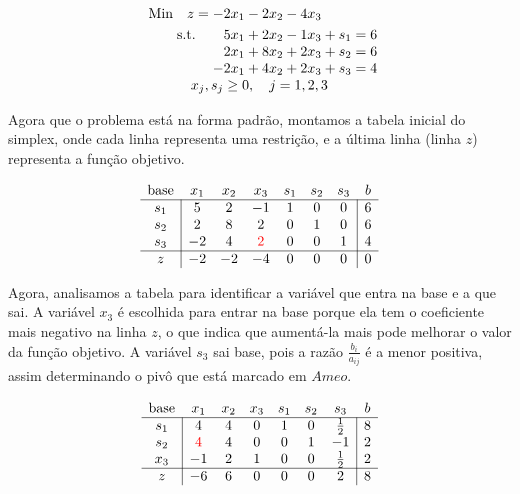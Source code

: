 \documentclass{article}
\begin{document}
\[
  \begin{array}{r@{}r@{}r@{}r@{}r@{}r@{}r}
    \text{Min} \quad z =  -2x_1 &{} - 2x_2 &{} - 4x_3 &{} \\[\jot]
    \text{s.t.}\quad\quad  5x_1 &{} + 2x_2 &{} - 1x_3 &{} + s_1 &{} = 6\\
                           2x_1 &{} + 8x_2 &{} + 2x_3 &{} + s_2 &{} = 6\\
                          -2x_1 &{} + 4x_2 &{} + 2x_3 &{} + s_3 &{} = 4\\

    \multicolumn{5}{c}{x_j, s_j \geq 0, \quad j=1, 2, 3}
  \end{array}
\]

Agora que o problema está na forma padrão, montamos a tabela inicial do simplex, onde cada linha representa uma restrição, e a última linha (linha \(z\)) representa a função objetivo.

\[
  \begin{array}{c|cccccc|c}
    \text{base} & x_1 & x_2 & x_3 & s_1 & s_2 & s_3 & b  \\ \hline
            s_1 &   5 &   2 &  -1 &   1 &   0 &   0 &        6 \\
            s_2 &   2 &   8 &   2 &   0 &   1 &   0 &        6 \\
            s_3 &  -2 &   4 &   \color{red}2\color{black} &   0 &   0 &   1 &        4 \\ \hline
              z &  -2 &  -2 &  -4 &   0 &   0 &   0 &        0
  \end{array}
\]

Agora, analisamos a tabela para identificar a variável que entra na base e a que sai. A variável \(x_3\) é escolhida para entrar na base porque ela tem o coeficiente mais negativo na linha \(z\), o que indica que aumentá-la mais pode melhorar o valor da função objetivo. A variável $s_3$ sai base, pois a razão \( \frac{b_i}{a_{ij}} \) é a menor positiva, assim determinando o pivô que está marcado em $Ameo$.

\[
  \begin{array}{c|cccccc|c}
    \text{base}                       & x_1 & x_2 & x_3 & s_1 & s_2 &         s_3 & b \\ \hline
    s_1 &                           4 &   4 &   0 &   1 &   0 & \frac{1}{2} & 8 \\
    s_2 &  \color{red}4 \color{black} &   4 &   0 &   0 &   1 &          -1 & 2 \\
    x_3 &                          -1 &   2 &   1 &   0 &   0 & \frac{1}{2} & 2 \\ \hline
      z &                          -6 &   6 &   0 &   0 &   0 &           2 & 8
  \end{array}
\]
\end{document}
